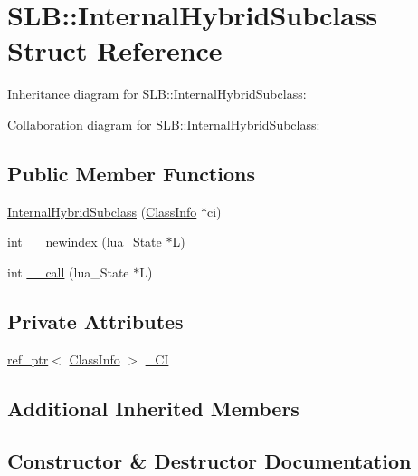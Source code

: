 \hypertarget{structSLB_1_1InternalHybridSubclass}{}\section{S\+LB\+:\+:Internal\+Hybrid\+Subclass Struct Reference}
\label{structSLB_1_1InternalHybridSubclass}


Inheritance diagram for S\+LB\+:\+:Internal\+Hybrid\+Subclass\+:


Collaboration diagram for S\+LB\+:\+:Internal\+Hybrid\+Subclass\+:
\subsection*{Public Member Functions}
\begin{DoxyCompactItemize}
\item 
\hyperlink{structSLB_1_1InternalHybridSubclass_a052e1682bd649a30ed53c537ad5a0320}{Internal\+Hybrid\+Subclass} (\hyperlink{classSLB_1_1ClassInfo}{Class\+Info} $\ast$ci)
\item 
int \hyperlink{structSLB_1_1InternalHybridSubclass_ada36156e86d527456b585d107036798e}{\+\_\+\+\_\+newindex} (lua\+\_\+\+State $\ast$L)
\item 
int \hyperlink{structSLB_1_1InternalHybridSubclass_ac72c413da1ba6e549bf89029b0f4cf61}{\+\_\+\+\_\+call} (lua\+\_\+\+State $\ast$L)
\end{DoxyCompactItemize}
\subsection*{Private Attributes}
\begin{DoxyCompactItemize}
\item 
\hyperlink{classSLB_1_1ref__ptr}{ref\+\_\+ptr}$<$ \hyperlink{classSLB_1_1ClassInfo}{Class\+Info} $>$ \hyperlink{structSLB_1_1InternalHybridSubclass_a309091b1905007e67c9d91f66bbf2dc3}{\+\_\+\+CI}
\end{DoxyCompactItemize}
\subsection*{Additional Inherited Members}


\subsection{Constructor \& Destructor Documentation}
